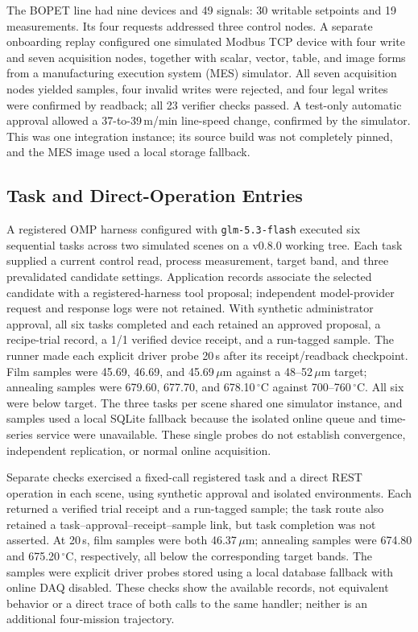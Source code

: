 The BOPET line had nine devices and 49 signals: 30 writable setpoints and 19
measurements. Its four requests addressed three control nodes. A separate
onboarding replay configured one simulated Modbus TCP device with four write
and seven acquisition nodes, together with scalar, vector, table, and image
forms from a manufacturing execution system (MES) simulator. All seven
acquisition nodes yielded samples, four invalid writes were rejected, and four
legal writes were confirmed by readback; all 23 verifier checks passed. A
test-only automatic approval allowed a 37-to-39\,m/min line-speed change,
confirmed by the simulator. This was one integration instance; its source
build was not completely pinned, and the MES image used a local storage
fallback.

\subsection{Task and Direct-Operation Entries}
A registered OMP harness configured with \texttt{glm-5.3-flash} executed six
sequential tasks across two simulated scenes on a v0.8.0 working tree. Each
task supplied a current control read, process measurement, target band, and
three prevalidated candidate settings. Application records associate the
selected candidate with a registered-harness tool proposal; independent
model-provider request and response logs were not retained. With synthetic
administrator approval, all six tasks completed and each retained an approved
proposal, a recipe-trial record, a 1/1 verified device receipt, and a
run-tagged sample. The runner made each explicit driver probe 20\,s after its
receipt/readback checkpoint. Film samples were 45.69, 46.69, and
45.69\,$\mu$m against a 48--52\,$\mu$m target; annealing samples were 679.60,
677.70, and 678.10\,$^{\circ}$C against 700--760\,$^{\circ}$C. All six were
below target. The three tasks per scene shared one simulator instance, and
samples used a local SQLite fallback because the isolated online queue and
time-series service were unavailable. These single probes do not establish
convergence, independent replication, or normal online acquisition.

Separate checks exercised a fixed-call registered task and a direct REST
operation in each scene, using synthetic approval and isolated environments.
Each returned a verified trial receipt and a run-tagged sample; the task route
also retained a task--approval--receipt--sample link, but task completion was
not asserted. At 20\,s, film samples were both 46.37\,$\mu$m; annealing samples
were 674.80 and 675.20\,$^{\circ}$C, respectively, all below the corresponding
target bands. The samples were explicit driver probes stored using a local
database fallback with online DAQ disabled. These checks show the available
records, not equivalent behavior or a direct trace of both calls to the same
handler; neither is an additional four-mission trajectory.

